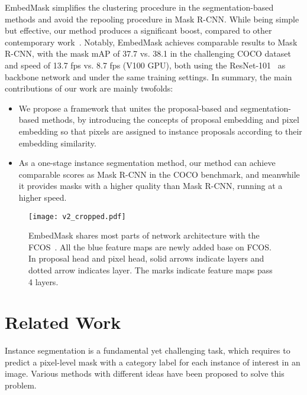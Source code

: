 \documentclass[10pt,twocolumn,letterpaper]{article}
\begin{document}
EmbedMask simplifies the clustering procedure in the segmentation-based methods and avoid the repooling procedure in Mask R-CNN. 
While being simple but effective, our method produces a significant boost, compared to other contemporary work~\cite{bolya-iccv2019, xie2019polarmask}. 
Notably, EmbedMask achieves comparable results to Mask R-CNN, with the mask mAP of 37.7 vs. 38.1 in the challenging COCO dataset~\cite{lin2014microsoft} and speed of 13.7 fps vs. 8.7 fps (V100 GPU), both using the ResNet-101~\cite{he2016deep} as backbone network and under the same training settings. In summary, the main contributions of our work are mainly twofolds:
\begin{itemize}

\item We propose a framework that unites the proposal-based and segmentation-based methods, by introducing the concepts of proposal embedding and pixel embedding so that pixels are assigned to instance proposals according to their embedding similarity.
\item As a one-stage instance segmentation method, our method can achieve comparable scores as Mask R-CNN in the COCO benchmark, and meanwhile it provides masks with a higher quality than Mask R-CNN, running at a higher speed. 

\end{itemize}

\begin{figure*}
   \begin{center}
      \texttt{[image: v2\_cropped.pdf]}
   \end{center}
      \caption{EmbedMask shares most parts of network architecture with the 
      FCOS~\cite{tian2019fcos}. All the blue feature maps are newly added base on FCOS.
      In proposal head and pixel head, solid arrows indicate  layers and dotted arrow indicates  layer. 
      The  marks indicate feature maps pass 4  layers.
}
   \label{fig:architecture}
\end{figure*}

\section{Related Work}

Instance segmentation is a fundamental yet challenging task, which requires to predict a pixel-level mask with a category label for each instance of interest in an image. 
Various methods with different ideas have been proposed to solve this problem. 
\end{document}
